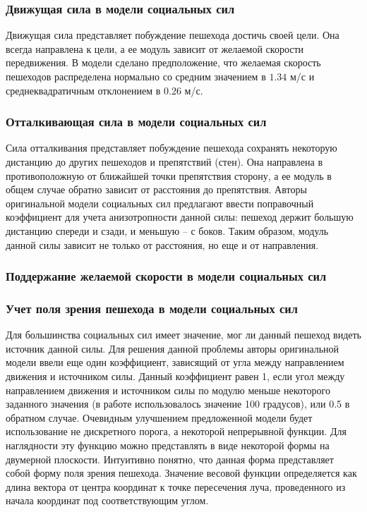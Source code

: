 \subsubsection{Движущая сила в модели социальных сил}
\label{sec:model:sf:moving_force}

Движущая сила представляет побуждение пешехода достичь своей цели.
Она всегда направлена к цели, а ее модуль зависит от желаемой скорости передвижения.
В модели сделано предположение, что желаемая скорость пешеходов распределена нормально со средним значением в $1.34$ м/с и среднеквадратичным отклонением в $0.26$ м/с.

\subsubsection{Отталкивающая сила в модели социальных сил}
\label{sec:model:sf:repulsion_force}

Сила отталкивания представляет побуждение пешехода сохранять некоторую дистанцию до других пешеходов и препятствий (стен).
Она направлена в противоположную от ближайшей точки препятствия сторону, а ее модуль в общем случае обратно зависит от расстояния до препятствия.
Авторы оригинальной модели социальных сил предлагают ввести поправочный коэффициент для учета анизотропности данной силы: пешеход держит большую дистанцию спереди и сзади, и меньшую – с боков.
Таким образом, модуль данной силы зависит не только от расстояния, но еще и от направления.

\subsubsection{Поддержание желаемой скорости в модели социальных сил}
\label{sec:model:sf:desired_speed}

\subsubsection{Учет поля зрения пешехода в модели социальных сил}
\label{sec:model:sf:fov}

Для большинства социальных сил имеет значение, мог ли данный пешеход видеть источник данной силы.
Для решения данной проблемы авторы оригинальной модели ввели еще один коэффициент, зависящий от угла между направлением движения и источником силы.
Данный коэффициент равен 1, если угол между направлением движения и источником силы по модулю меньше некоторого заданного значения (в работе использовалось значение 100 градусов), или 0.5 в обратном случае.
Очевидным улучшением предложенной модели будет использование не дискретного порога, а некоторой непрерывной функции.
Для наглядности эту функцию можно представлять в виде некоторой формы на двумерной плоскости.
Интуитивно понятно, что данная форма представляет собой форму поля зрения пешехода.
Значение весовой функции определяется как длина вектора от центра координат к точке пересечения луча, проведенного из начала координат под соответствующим углом.

